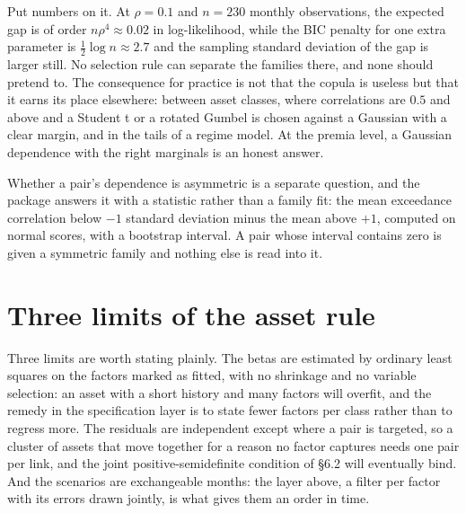 \documentclass[11pt]{article}
\begin{document}
Put numbers on it. At $\rho = 0.1$ and $n = 230$ monthly observations, the
expected gap is of order $n\rho^4 \approx 0.02$ in log-likelihood, while the BIC
penalty for one extra parameter is $\tfrac12\log n \approx 2.7$ and the sampling
standard deviation of the gap is larger still. No selection rule can separate
the families there, and none should pretend to. The consequence for practice is
not that the copula is useless but that it earns its place elsewhere: between
asset classes, where correlations are $0.5$ and above and a Student t or a
rotated Gumbel is chosen against a Gaussian with a clear margin, and in the
tails of a regime model. At the premia level, a Gaussian dependence with the
right marginals is an honest answer.

Whether a pair's dependence is asymmetric is a separate question, and the
package answers it with a statistic rather than a family fit: the mean
exceedance correlation below $-1$ standard deviation minus the mean above $+1$,
computed on normal scores, with a bootstrap interval. A pair whose interval
contains zero is given a symmetric family and nothing else is read into it.

\section{Three limits of the asset rule}

Three limits are worth stating plainly. The betas are estimated by ordinary
least squares on the factors marked as fitted, with no shrinkage and no
variable selection: an asset with a short history and many factors will
overfit, and the remedy in the specification layer is to state fewer factors
per class rather than to regress more. The residuals are independent except
where a pair is targeted, so a cluster of assets that move together for a
reason no factor captures needs one pair per link, and the joint
positive-semidefinite condition of \S6.2 will eventually bind. And the
scenarios are exchangeable months: the layer above, a filter per factor with
its errors drawn jointly, is what gives them an order in time.
\end{document}
